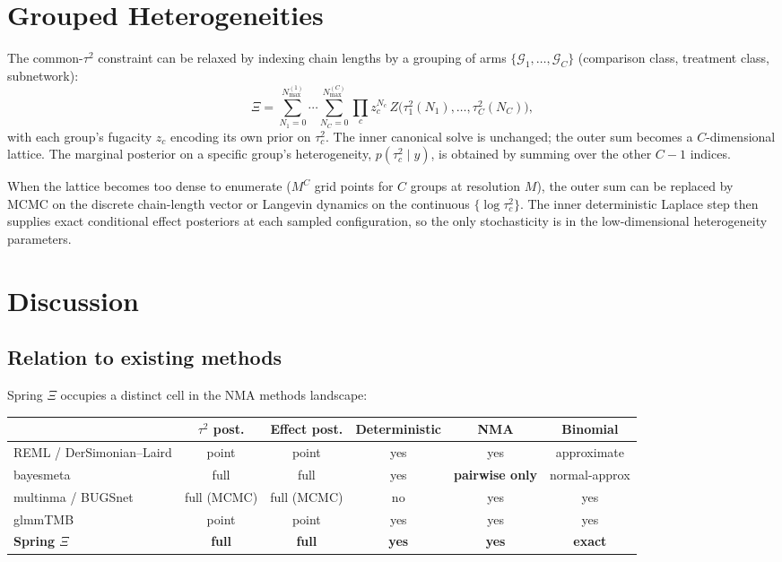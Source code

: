 \documentclass[12pt]{article}
\begin{document}
\section{Grouped Heterogeneities}\label{sec:grouped}

The common-$\tau^2$ constraint can be relaxed by indexing chain
lengths by a grouping of arms
$\{\mathcal{G}_1, \ldots, \mathcal{G}_C\}$ (comparison class,
treatment class, subnetwork):
\begin{equation}
\Xi = \sum_{N_1 = 0}^{N^{(1)}_{\max}} \cdots
\sum_{N_C = 0}^{N^{(C)}_{\max}}
\prod_c z_c^{N_c} \,
Z\bigl(\tau^2_1(N_1), \ldots, \tau^2_C(N_C)\bigr),
\end{equation}
with each group's fugacity $z_c$ encoding its own prior on
$\tau^2_c$. The inner canonical solve is unchanged; the outer sum
becomes a $C$-dimensional lattice. The marginal posterior on a
specific group's heterogeneity,
$p(\tau^2_c \mid y)$, is obtained by summing over the other $C - 1$
indices.

When the lattice becomes too dense to enumerate
($M^C$ grid points for $C$ groups at resolution $M$), the outer sum
can be replaced by MCMC on the discrete chain-length vector or
Langevin dynamics on the continuous $\{\log \tau^2_c\}$. The inner
deterministic Laplace step then supplies exact conditional effect
posteriors at each sampled configuration, so the only stochasticity
is in the low-dimensional heterogeneity parameters.

\section{Discussion}

\subsection{Relation to existing methods}

Spring $\Xi$ occupies a distinct cell in the NMA methods landscape:

\begin{center}
\begin{tabular}{lccccc}
\toprule
& $\tau^2$ post. & Effect post. & Deterministic & NMA & Binomial \\
\midrule
REML / DerSimonian--Laird & point & point & yes & yes & approximate \\
bayesmeta & full & full & yes & \textbf{pairwise only} & normal-approx \\
multinma / BUGSnet & full (MCMC) & full (MCMC) & no & yes & yes \\
glmmTMB & point & point & yes & yes & yes \\
\textbf{Spring $\Xi$} & \textbf{full} & \textbf{full} & \textbf{yes} & \textbf{yes} & \textbf{exact} \\
\bottomrule
\end{tabular}
\end{center}
\end{document}

